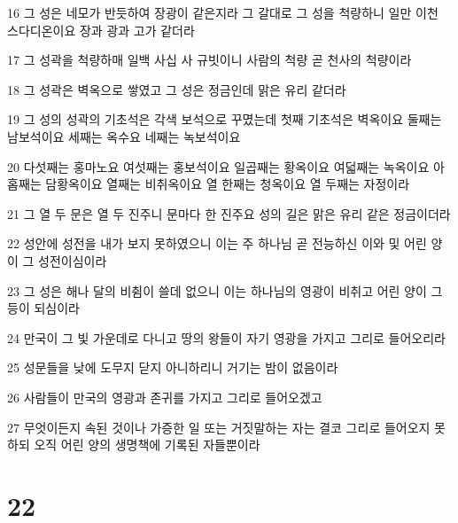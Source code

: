 \par 16 그 성은 네모가 반듯하여 장광이 같은지라 그 갈대로 그 성을 척량하니 일만 이천 스다디온이요 장과 광과 고가 같더라
\par 17 그 성곽을 척량하매 일백 사십 사 규빗이니 사람의 척량 곧 천사의 척량이라
\par 18 그 성곽은 벽옥으로 쌓였고 그 성은 정금인데 맑은 유리 같더라
\par 19 그 성의 성곽의 기초석은 각색 보석으로 꾸몄는데 첫째 기초석은 벽옥이요 둘째는 남보석이요 세째는 옥수요 네째는 녹보석이요
\par 20 다섯째는 홍마노요 여섯째는 홍보석이요 일곱째는 황옥이요 여덟째는 녹옥이요 아홉째는 담황옥이요 열째는 비취옥이요 열 한째는 청옥이요 열 두째는 자정이라
\par 21 그 열 두 문은 열 두 진주니 문마다 한 진주요 성의 길은 맑은 유리 같은 정금이더라
\par 22 성안에 성전을 내가 보지 못하였으니 이는 주 하나님 곧 전능하신 이와 및 어린 양이 그 성전이심이라
\par 23 그 성은 해나 달의 비췸이 쓸데 없으니 이는 하나님의 영광이 비취고 어린 양이 그 등이 되심이라
\par 24 만국이 그 빛 가운데로 다니고 땅의 왕들이 자기 영광을 가지고 그리로 들어오리라
\par 25 성문들을 낮에 도무지 닫지 아니하리니 거기는 밤이 없음이라
\par 26 사람들이 만국의 영광과 존귀를 가지고 그리로 들어오겠고
\par 27 무엇이든지 속된 것이나 가증한 일 또는 거짓말하는 자는 결코 그리로 들어오지 못하되 오직 어린 양의 생명책에 기록된 자들뿐이라

\chapter{22}

